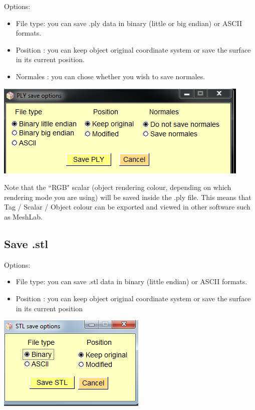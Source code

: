 \begin{minipage}{0.5\textwidth}
Options:
\begin{itemize}
\item File type: you can save .ply data in binary (little or big endian)
or ASCII formats.
\item Position : you can keep object original coordinate system or
save the surface in its current position.
\item Normales : you can chose whether you wish to save normales.
\end{itemize}

\end{minipage}    
\begin{minipage}{0.45\textwidth}\centering
  \includegraphics[scale=0.45]{images/File/Save_ply_new.png}
 \end{minipage} 

Note that the ``RGB" scalar (object rendering colour, depending on which rendering mode you
are using) will be saved inside the .ply file. This means that Tag / Scalar / Object colour can be exported and viewed in other software such as MeshLab.


\subsection{Save .stl}

\begin{minipage}{0.5\textwidth}
Options:
\begin{itemize}
\item File type: you can save .stl data in binary (little endian) or
ASCII formats.

\item Position : you can keep object original coordinate system or save the surface in its current position
\end{itemize}

\end{minipage}    
\begin{minipage}{0.4\textwidth}\centering
  \includegraphics[scale=0.5]{images/File/Save_stl.png}
 \end{minipage} 





